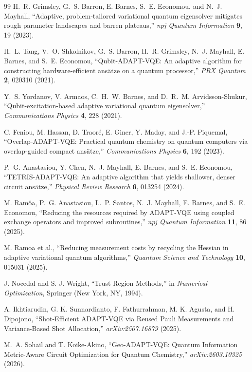 \documentclass[
  reprint,
  amsmath,
  amssymb,
  aps,
  pra,
  nofootinbib,
  superscriptaddress,
  floatfix
]{revtex4-2}
\begin{document}
\begin{thebibliography}{99}
H.~R. Grimsley, G.~S. Barron, E. Barnes, S.~E. Economou, and N.~J. Mayhall,
``Adaptive, problem-tailored variational quantum eigensolver mitigates rough parameter landscapes and barren plateaus,''
\emph{npj Quantum Information} \textbf{9}, 19 (2023).

H.~L. Tang, V.~O. Shkolnikov, G.~S. Barron, H.~R. Grimsley, N.~J. Mayhall, E. Barnes, and S.~E. Economou,
``Qubit-ADAPT-VQE: An adaptive algorithm for constructing hardware-efficient ans\"atze on a quantum processor,''
\emph{PRX Quantum} \textbf{2}, 020310 (2021).

Y.~S. Yordanov, V. Armaos, C.~H.~W. Barnes, and D.~R.~M. Arvidsson-Shukur,
``Qubit-excitation-based adaptive variational quantum eigensolver,''
\emph{Communications Physics} \textbf{4}, 228 (2021).

C. Feniou, M. Hassan, D. Traor\'e, E. Giner, Y. Maday, and J.-P. Piquemal,
``Overlap-ADAPT-VQE: Practical quantum chemistry on quantum computers via overlap-guided compact ans\"atze,''
\emph{Communications Physics} \textbf{6}, 192 (2023).

P.~G. Anastasiou, Y. Chen, N.~J. Mayhall, E. Barnes, and S.~E. Economou,
``TETRIS-ADAPT-VQE: An adaptive algorithm that yields shallower, denser circuit ans\"atze,''
\emph{Physical Review Research} \textbf{6}, 013254 (2024).

M. Ram\^oa, P.~G. Anastasiou, L.~P. Santos, N.~J. Mayhall, E. Barnes, and S.~E. Economou,
``Reducing the resources required by ADAPT-VQE using coupled exchange operators and improved subroutines,''
\emph{npj Quantum Information} \textbf{11}, 86 (2025).

M. Ramoa et al.,
``Reducing measurement costs by recycling the Hessian in adaptive variational quantum algorithms,''
\emph{Quantum Science and Technology} \textbf{10}, 015031 (2025).

J. Nocedal and S. J. Wright,
``Trust-Region Methods,''
in \emph{Numerical Optimization}, Springer (New York, NY, 1994).

A. Ikhtiarudin, G. K. Sunnardianto, F. Fathurrahman, M. K. Agusta, and H. Dipojono,
``Shot-Efficient ADAPT-VQE via Reused Pauli Measurements and Variance-Based Shot Allocation,''
\emph{arXiv:2507.16879} (2025).

M.~A. Sohail and T. Koike-Akino,
``Geo-ADAPT-VQE: Quantum Information Metric-Aware Circuit Optimization for Quantum Chemistry,''
\emph{arXiv:2603.10325} (2026).


\end{thebibliography}
\end{document}
